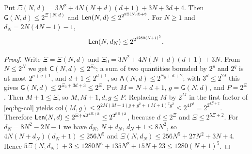 \begin{lemma}\label{lem:bg-estimate}
Put $\Xi(N,d)=3N^2+4N(N+d)(d+1)+3N+3d+4$. Then
$\mathsf G(N,d)\le2^{\Xi(N,d)}$ and $\mathsf{Len}(N,d)\le2^{2^{5\Xi(N,d)+3}}$. For
$N\ge1$ and $d_N=2N(4N-1)-1$,
\[
 \mathsf{Len}(N,d_N)\le2^{2^{1280(N+1)^5}} .
\]
\end{lemma}
\begin{proof}
Write $\Xi=\Xi(N,d)$ and $\Xi_0=3N^2+4N(N+d)(d+1)+3N$. From $N\le2^N$ we get
$\mathsf C(N,d)\le2^{\Xi_0}$; a sum of two quantities bounded by $2^p$ and $2^q$
is at most $2^{p+q+1}$, and $d+1\le2^{d+1}$, so $\mathsf A(N,d)\le2^{\Xi_0+d+2}$;
with $3^d\le2^{2d}$ this gives $\mathsf G(N,d)\le2^{\Xi_0+3d+3}\le2^\Xi$. Put
$M=N+d+1$, $g=\mathsf G(N,d)$, and $P=2^\Xi$. Then $M+1\le\Xi$, so
$M,M+1,d,g\le P$. Replacing $M$ by $2^M$ in the first factor of
\cref{eq:bg-col} yields
$\mathsf{col}(M,g)\le2^{2M(M+1)g+g^2+(M+1)^2g^2}\le2^{4P^4}=2^{2^{4\Xi+2}}$.
Therefore $\mathsf{Len}(N,d)\le2^{\Xi+d2^{4\Xi+2}}\le2^{2^{5\Xi+3}}$, because
$d\le2^\Xi$ and $\Xi\le2^{5\Xi+2}$. For $d_N=8N^2-2N-1$ we have $d_N$,
$N+d_N$, $d_N+1\le8N^2$, so $4N(N+d_N)(d_N+1)\le256N^5$ and
$\Xi(N,d_N)\le256N^5+27N^2+3N+4$. Hence $5\Xi(N,d_N)+3\le1280N^5+135N^2+15N+23
\le1280(N+1)^5$.
\end{proof}

